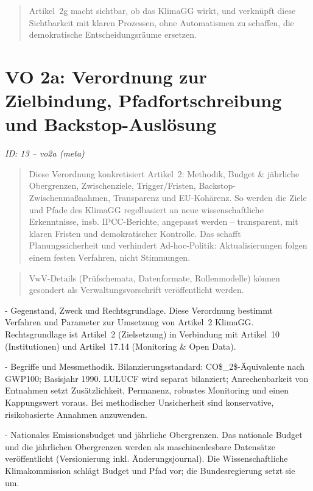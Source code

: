 \documentclass[12pt,a4paper]{scrartcl}
\begin{document}
{\footnotesize\begin{quote}
Artikel 2g macht sichtbar, ob das KlimaGG wirkt, und verknüpft diese Sichtbarkeit mit klaren Prozessen, ohne Automatismen zu schaffen, die demokratische Entscheidungsräume ersetzen.
\end{quote}}



\section[VO 2a: Verordnung zur Zielbindung, Pfadfortschreibung und Backstop-Auslösung]{VO 2a: Verordnung zur Zielbindung, Pfadfortschreibung und Backstop-Auslösung}
\noindent\textit{ID: 13 -- vo2a (meta)}

\begin{quote}
Diese Verordnung konkretisiert Artikel 2: Methodik, Budget \& jährliche Obergrenzen, Zwischenziele, Trigger/Fristen, Backstop-Zwischenmaßnahmen, Transparenz und EU-Kohärenz. So werden die Ziele und Pfade des KlimaGG regelbasiert an neue wissenschaftliche Erkenntnisse, insb. IPCC-Berichte, angepasst werden -- transparent, mit klaren Fristen und demokratischer Kontrolle. Das schafft Planungssicherheit und verhindert Ad-hoc-Politik: Aktualisierungen folgen einem festen Verfahren, nicht Stimmungen.
\end{quote}

{\footnotesize\begin{quote}
VwV-Details (Prüfschemata, Datenformate, Rollenmodelle) können gesondert als Verwaltungsvorschrift veröffentlicht werden.
\end{quote}}


- Gegenstand, Zweck und Rechtsgrundlage. Diese Verordnung bestimmt Verfahren und Parameter zur Umsetzung von Artikel 2 KlimaGG. Rechtsgrundlage ist Artikel 2 (Zielsetzung) in Verbindung mit Artikel 10 (Institutionen) und Artikel 17.14 (Monitoring \& Open Data).

- Begriffe und Messmethodik. Bilanzierungsstandard: CO\$\_2\$-Äquivalente nach GWP100; Basisjahr 1990. LULUCF wird separat bilanziert; Anrechenbarkeit von Entnahmen setzt Zusätzlichkeit, Permanenz, robustes Monitoring und einen Kappungswert voraus. Bei methodischer Unsicherheit sind konservative, risikobasierte Annahmen anzuwenden.

- Nationales Emissionsbudget und jährliche Obergrenzen. Das nationale Budget und die jährlichen Obergrenzen werden als maschinenlesbare Datensätze veröffentlicht (Versionierung inkl. Änderungsjournal). Die Wissenschaftliche Klimakommission schlägt Budget und Pfad vor; die Bundesregierung setzt sie um.
\end{document}
